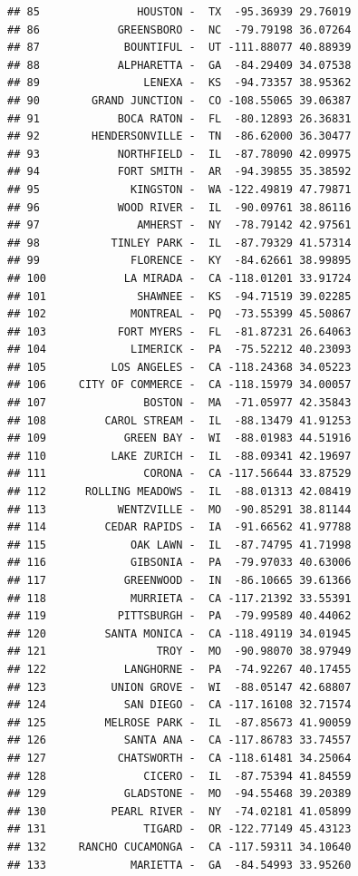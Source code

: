 \documentclass{article}\usepackage[]{graphicx}\usepackage[]{color}
\makeatletter
\newenvironment{kframe}{%
 \def\at@end@of@kframe{}%
 \ifinner\ifhmode%
  \def\at@end@of@kframe{\end{minipage}}%
  \begin{minipage}{\columnwidth}%
 \fi\fi%
 \def\FrameCommand##1{\hskip\@totalleftmargin \hskip-\fboxsep
 \colorbox{shadecolor}{##1}\hskip-\fboxsep
     \hskip-\linewidth \hskip-\@totalleftmargin \hskip\columnwidth}%
 \MakeFramed {\advance\hsize-\width
   \@totalleftmargin\z@ \linewidth\hsize
   \@setminipage}}%
 {\par\unskip\endMakeFramed%
 \at@end@of@kframe}
\newenvironment{knitrout}{}{} %
\makeatother
\begin{document}
\begin{knitrout}
\begin{kframe}
\begin{verbatim}
## 85               HOUSTON -  TX  -95.36939 29.76019
## 86            GREENSBORO -  NC  -79.79198 36.07264
## 87             BOUNTIFUL -  UT -111.88077 40.88939
## 88            ALPHARETTA -  GA  -84.29409 34.07538
## 89                LENEXA -  KS  -94.73357 38.95362
## 90        GRAND JUNCTION -  CO -108.55065 39.06387
## 91            BOCA RATON -  FL  -80.12893 26.36831
## 92        HENDERSONVILLE -  TN  -86.62000 36.30477
## 93            NORTHFIELD -  IL  -87.78090 42.09975
## 94            FORT SMITH -  AR  -94.39855 35.38592
## 95              KINGSTON -  WA -122.49819 47.79871
## 96            WOOD RIVER -  IL  -90.09761 38.86116
## 97               AMHERST -  NY  -78.79142 42.97561
## 98           TINLEY PARK -  IL  -87.79329 41.57314
## 99              FLORENCE -  KY  -84.62661 38.99895
## 100            LA MIRADA -  CA -118.01201 33.91724
## 101              SHAWNEE -  KS  -94.71519 39.02285
## 102             MONTREAL -  PQ  -73.55399 45.50867
## 103           FORT MYERS -  FL  -81.87231 26.64063
## 104             LIMERICK -  PA  -75.52212 40.23093
## 105          LOS ANGELES -  CA -118.24368 34.05223
## 106     CITY OF COMMERCE -  CA -118.15979 34.00057
## 107               BOSTON -  MA  -71.05977 42.35843
## 108         CAROL STREAM -  IL  -88.13479 41.91253
## 109            GREEN BAY -  WI  -88.01983 44.51916
## 110          LAKE ZURICH -  IL  -88.09341 42.19697
## 111               CORONA -  CA -117.56644 33.87529
## 112      ROLLING MEADOWS -  IL  -88.01313 42.08419
## 113           WENTZVILLE -  MO  -90.85291 38.81144
## 114         CEDAR RAPIDS -  IA  -91.66562 41.97788
## 115             OAK LAWN -  IL  -87.74795 41.71998
## 116             GIBSONIA -  PA  -79.97033 40.63006
## 117            GREENWOOD -  IN  -86.10665 39.61366
## 118             MURRIETA -  CA -117.21392 33.55391
## 119           PITTSBURGH -  PA  -79.99589 40.44062
## 120         SANTA MONICA -  CA -118.49119 34.01945
## 121                 TROY -  MO  -90.98070 38.97949
## 122            LANGHORNE -  PA  -74.92267 40.17455
## 123          UNION GROVE -  WI  -88.05147 42.68807
## 124            SAN DIEGO -  CA -117.16108 32.71574
## 125         MELROSE PARK -  IL  -87.85673 41.90059
## 126            SANTA ANA -  CA -117.86783 33.74557
## 127           CHATSWORTH -  CA -118.61481 34.25064
## 128               CICERO -  IL  -87.75394 41.84559
## 129            GLADSTONE -  MO  -94.55468 39.20389
## 130          PEARL RIVER -  NY  -74.02181 41.05899
## 131               TIGARD -  OR -122.77149 45.43123
## 132     RANCHO CUCAMONGA -  CA -117.59311 34.10640
## 133             MARIETTA -  GA  -84.54993 33.95260

\end{verbatim}
\end{kframe}
\end{knitrout}
\end{document}

